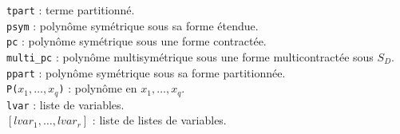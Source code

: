 {\tt tpart} : terme partitionn\'{e}.\\

{\tt psym} : polyn\^{o}me sym\'{e}trique sous sa forme \'etendue.\\

{\tt pc} : polyn\^{o}me sym\'etrique sous une forme contract\'{ee}.\\

{\tt multi\_pc} : polyn\^{o}me multisym\'etrique sous une forme
multicontract\'{ee} sous $S_D$.\\

{\tt ppart} : polyn\^{o}me sym\'etrique sous sa forme partitionn\'{ee}.\\

{\tt P($x_1, \ldots , x_q$)} :  polyn\^{o}me en $x_1, \ldots , x_q$.\\

{\tt lvar} : liste de variables.\\

$[lvar_1, \ldots,lvar_r]$ : liste de listes de variables.


\tableofcontents 

